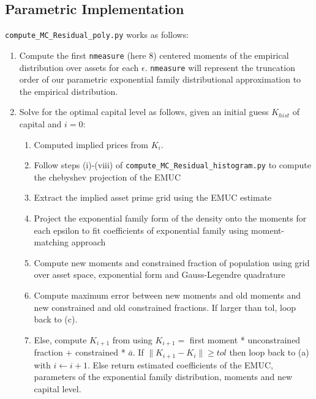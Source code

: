 \documentclass[11pt]{article}
\newcommand{\code}[1]{\texttt{#1}}
\begin{document}
\subsection{Parametric Implementation}
\code{compute\_MC\_Residual\_poly.py} works as follows: 
\begin{enumerate}
	
\item Compute the first \code{nmeasure} (here 8) centered moments of the empirical distribution over assets for each $\epsilon$. \code{nmeasure} will represent the truncation order of our parametric exponential family distributional approximation to the empirical distribution.

\item 	Solve for the optimal capital level as follows, given an initial guess $K_{hist}$ of capital and $i=0$:
\begin{enumerate}
\item Computed implied prices from $K_i$.
\item Follow steps (i)-(viii) of \code{compute\_MC\_Residual\_histogram.py} to compute the chebyshev projection of the EMUC
\item Extract the implied asset prime grid using the EMUC estimate
\item Project the exponential family form of the density onto the moments for each epsilon to fit coefficients of exponential family using moment-matching approach
\item Compute new moments and constrained fraction of population using grid over asset space, exponential form and Gauss-Legendre quadrature
\item Compute maximum error between new moments and old moments and new constrained and old constrained fractions. If larger than tol, loop back to (c). 
\item Else, compute $K_{i+1}$ from using $K_{i+1} = $ first moment *  unconstrained fraction + constrained * $\bar{a}$. If $\lVert K_{i+1} - K_{i}\rVert \geq  tol$ then loop back to (a) with $i \leftarrow i+1$.  Else return estimated coefficients of the EMUC, parameters of the exponential family distribution, moments and new capital level. 

\end{enumerate}
\end{enumerate}
\printbibliography
\end{document}
